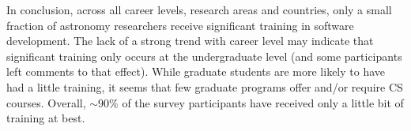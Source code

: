 In conclusion, across all career levels, research areas and countries, only a small fraction of astronomy researchers receive significant training in software development. The lack of a strong trend with career level may indicate that significant training only occurs at the undergraduate level (and some participants left comments to that effect). While graduate students are more likely to have had a little training, it seems that few graduate programs offer and/or require CS courses. Overall, $\sim90\%$ of the survey participants have received only a little bit of training at best. 


